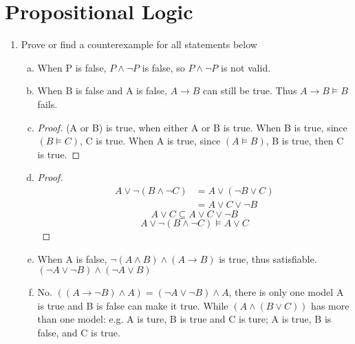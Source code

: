 \documentclass{article}
\theoremstyle{quest}
\begin{document}
\section*{Propositional Logic}
\begin{enumerate}
\item
Prove or find a counterexample for all 
statements below
\begin{enumerate}[a.]
\item
When P is false, $P\land \neg P$ is false, so $P\land \lnot P$ is not valid.
\item
When B is false and A is false, $A\rightarrow B$ can still be true. Thus $A\rightarrow B \models B$ fails.
\item
\begin{proof}
(A or B) is true, when either A or B is true. When B is true, since $(B\models C)$, C is true. When A is true, since $(A\models B)$, B is true, then C is true.
\qedhere
\end{proof}
\item
\begin{proof}
\begin{align*}
A\lor \lnot (B \land \lnot C) &= A \lor (\lnot B \lor C) \\
& = A \lor C \lor \lnot B 
\end{align*}
$$A \lor C \subseteq A\lor C \lor \lnot B $$
$$A\lor \lnot (B \land \lnot C)  \models A\lor C$$
\qedhere
\end{proof}
\item
When A is false, $\lnot (A\land B) \land (A\rightarrow B)$ is true, thus satisfiable. $(\lnot A \lor \lnot B)\land (\lnot A \lor B)$
\item
No. $((A\rightarrow \lnot B) \land A) = (\lnot A \lor \lnot B) \land A$, there is only one model A is true and B is false can make it true. While $(A\land (B\lor C))$ has more than one model: e.g. A is ture, B is true and C is ture; A is true, B is false, and C is true. 
\end{enumerate}
\end{enumerate}
\end{document}
